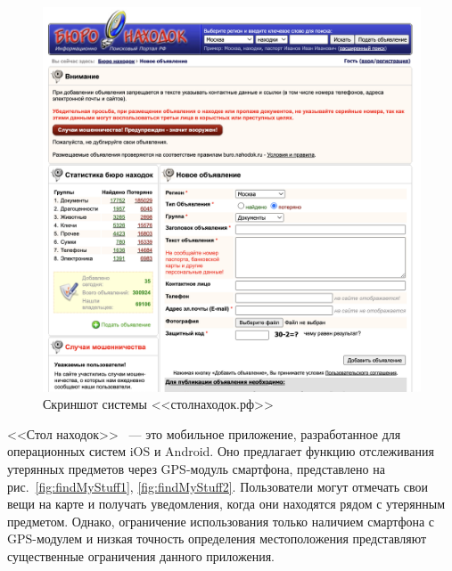 \begin{figure}[htb]
	\centering
	\includegraphics[width=.95\textwidth]{images/stolNahodok2}
	\parskip=6pt
	\caption{Скриншот системы <<столнаходок.рф>>}
	\label{fig:stolNahodok2}
\end{figure}

<<Стол находок>>~\cite{bib:stol_nahodok} --- это мобильное приложение, разработанное для операционных систем iOS и Android. Оно предлагает функцию отслеживания утерянных предметов через GPS-модуль смартфона, представлено на рис.~\ref{fig:findMyStuff1}, \ref{fig:findMyStuff2}. Пользователи могут отмечать свои вещи на карте и получать уведомления, когда они находятся рядом с утерянным предметом. Однако, ограничение использования только наличием смартфона с GPS-модулем и низкая точность определения местоположения представляют существенные ограничения данного приложения.

